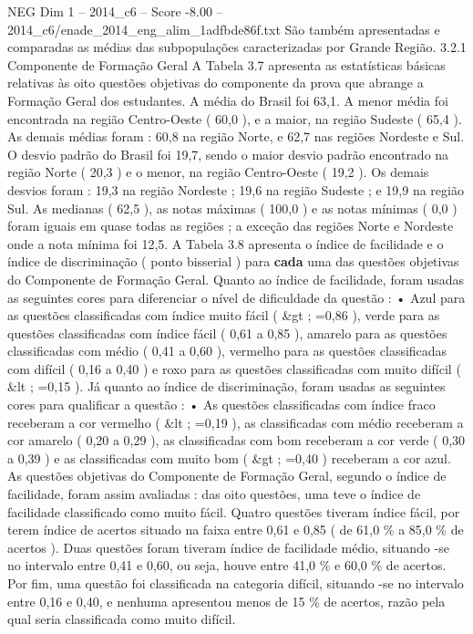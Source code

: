 \begin{textsample}{NEG Dim 1 – 2014\_c6 – Score -8.00 – 2014\_c6/enade\_2014\_eng\_alim\_1adfbde86f.txt}
São também apresentadas e comparadas as médias das subpopulações caracterizadas por Grande Região. 3.2.1 Componente de Formação Geral A Tabela 3.7 apresenta as estatísticas básicas relativas às oito questões objetivas do componente da prova que abrange a Formação Geral dos estudantes.
A média do Brasil foi 63,1.
A menor média foi encontrada na região Centro-Oeste ( 60,0 ), e a maior, na região Sudeste ( 65,4 ).
As demais médias foram : 60,8 na região Norte, e 62,7 nas regiões Nordeste e Sul.
O desvio padrão do Brasil foi 19,7, sendo o maior desvio padrão encontrado na região Norte ( 20,3 ) e o menor, na região Centro-Oeste ( 19,2 ).
Os demais desvios foram : 19,3 na região Nordeste ; 19,6 na região Sudeste ; e 19,9 na região Sul.
As medianas ( 62,5 ), as notas máximas ( 100,0 ) e as notas mínimas ( 0,0 ) foram iguais em quase todas as regiões ; a exceção das regiões Norte e Nordeste onde a nota mínima foi 12,5.
A Tabela 3.8 apresenta o índice de facilidade e o índice de discriminação ( ponto bisserial ) para \textbf{cada} uma das questões objetivas do Componente de Formação Geral.
Quanto ao índice de facilidade, foram usadas as seguintes cores para diferenciar o nível de dificuldade da questão : • Azul para as questões classificadas com índice muito fácil ( \&gt ; =0,86 ), verde para as questões classificadas com índice fácil ( 0,61 a 0,85 ), amarelo para as questões classificadas com médio ( 0,41 a 0,60 ), vermelho para as questões classificadas com difícil ( 0,16 a 0,40 ) e roxo para as questões classificadas com muito difícil ( \&lt ; =0,15 ).
Já quanto ao índice de discriminação, foram usadas as seguintes cores para qualificar a questão : • As questões classificadas com índice fraco receberam a cor vermelho ( \&lt ; =0,19 ), as classificadas com médio receberam a cor amarelo ( 0,20 a 0,29 ), as classificadas com bom receberam a cor verde ( 0,30 a 0,39 ) e as classificadas com muito bom ( \&gt ; =0,40 ) receberam a cor azul.
As questões objetivas do Componente de Formação Geral, segundo o índice de facilidade, foram assim avaliadas : das oito questões, uma teve o índice de facilidade classificado como muito fácil.
Quatro questões tiveram índice fácil, por terem índice de acertos situado na faixa entre 0,61 e 0,85 ( de 61,0 \% a 85,0 \% de acertos ).
Duas questões foram tiveram índice de facilidade médio, situando -se no intervalo entre 0,41 e 0,60, ou seja, houve entre 41,0 \% e 60,0 \% de acertos.
Por fim, uma questão foi classificada na categoria difícil, situando -se no intervalo entre 0,16 e 0,40, e nenhuma apresentou menos de 15 \% de acertos, razão pela qual seria classificada como muito difícil.

\end{textsample}

